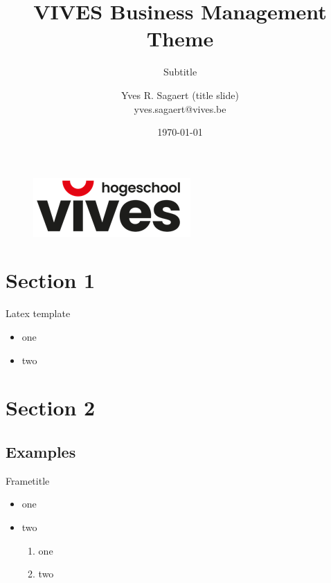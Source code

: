 \documentclass{beamer}
\author[Yves R. Sagaert]{Yves R. Sagaert (title slide) \\{\small yves.sagaert@vives.be}}
\title{VIVES Business Management Theme}
\subtitle{Subtitle}
\institute{VIVES University of Applied Sciences }
\date{\today}
\begin{document}
\begin{frame}
    \titlepage
    \begin{figure}[htpb]
        \begin{center}
            \includegraphics[width=0.35\linewidth]{fig/vives_logo2022.png}
        \end{center}
    \end{figure}
\end{frame}   
\begin{frame}
    \tableofcontents[sectionstyle=show,subsectionstyle=show/shaded/hide,subsubsectionstyle=show/shaded/hide]
\end{frame}


\section{Section 1}

\begin{frame}{Latex template}
    \begin{itemize}[<+-| alert@+>] 
        \item one
        \item two
    \end{itemize}
\end{frame}


\section{Section 2}

\subsection{Examples}

\begin{frame}{Frametitle}
    \begin{itemize}
        \item one
        \item two
        \begin{enumerate}
            \item one
            \item two
        \end{enumerate}
    \end{itemize}
\end{frame}
\end{document}
